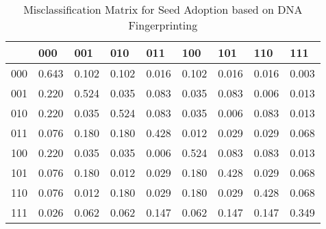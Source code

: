 \begin{table}[H]
\caption{Misclassification Matrix for Seed Adoption based on DNA Fingerprinting}
\label{tab:cm}
\centering
\begin{tabular}{lllllllll}
\toprule
 & 000 & 001 & 010 & 011 & 100 & 101 & 110 & 111 \\
\midrule
000 & 0.643 & 0.102 & 0.102 & 0.016 & 0.102 & 0.016 & 0.016 & 0.003 \\
001 & 0.220 & 0.524 & 0.035 & 0.083 & 0.035 & 0.083 & 0.006 & 0.013 \\
010 & 0.220 & 0.035 & 0.524 & 0.083 & 0.035 & 0.006 & 0.083 & 0.013 \\
011 & 0.076 & 0.180 & 0.180 & 0.428 & 0.012 & 0.029 & 0.029 & 0.068 \\
100 & 0.220 & 0.035 & 0.035 & 0.006 & 0.524 & 0.083 & 0.083 & 0.013 \\
101 & 0.076 & 0.180 & 0.012 & 0.029 & 0.180 & 0.428 & 0.029 & 0.068 \\
110 & 0.076 & 0.012 & 0.180 & 0.029 & 0.180 & 0.029 & 0.428 & 0.068 \\
111 & 0.026 & 0.062 & 0.062 & 0.147 & 0.062 & 0.147 & 0.147 & 0.349 \\
\bottomrule
\end{tabular}
\end{table}
